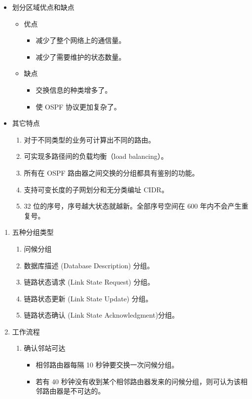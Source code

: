 \documentclass[11pt]{article}
\begin{document}
\begin{enumerate}
\begin{enumerate}
\begin{itemize}
\item 划分区域优点和缺点
\begin{itemize}
\item 优点
\begin{itemize}
\item 减少了整个网络上的通信量。
\item 减少了需要维护的状态数量。
\end{itemize}
\item 缺点
\begin{itemize}
\item 交换信息的种类增多了。
\item 使 OSPF 协议更加复杂了。
\end{itemize}
\end{itemize}
\item 其它特点
\begin{enumerate}
\item 对于不同类型的业务可计算出不同的路由。
\item 可实现多路径间的负载均衡（load balancing）。
\item 所有在 OSPF 路由器之间交换的分组都具有鉴别的功能。
\item 支持可变长度的子网划分和无分类编址 CIDR。
\item 32 位的序号，序号越大状态就越新。全部序号空间在 600 年内不会产生重复号。
\end{enumerate}
\end{itemize}
\begin{enumerate}
\item 五种分组类型
\label{sec:org2d4ed61}
\begin{enumerate}
\item 问候分组
\item 数据库描述 (Database Description) 分组。
\item 链路状态请求 (Link State Request) 分组。
\item 链路状态更新 (Link State Update) 分组。
\item 链路状态确认 (Link State Acknowledgment)分组。
\end{enumerate}
\item 工作流程
\label{sec:org177000d}
\begin{enumerate}
\item 确认邻站可达
\begin{itemize}
\item 相邻路由器每隔 10 秒钟要交换一次问候分组。
\item 若有 40 秒钟没有收到某个相邻路由器发来的问候分组，则可认为该相邻路由器是不可达的。

\end{itemize}
\end{enumerate}
\end{enumerate}
\end{enumerate}
\end{enumerate}
\end{document}
